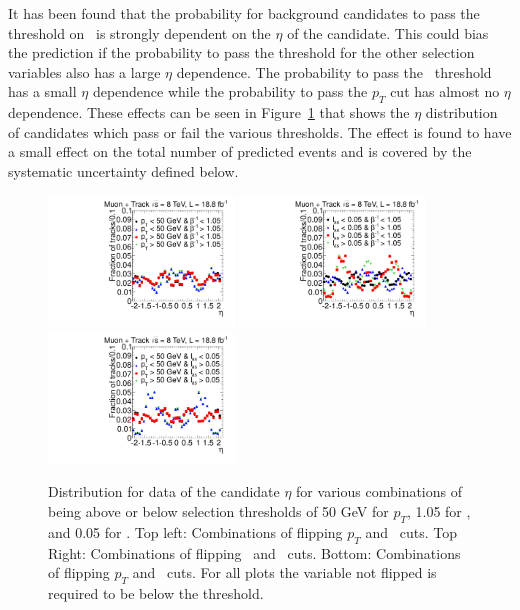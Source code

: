 It has been found that the probability for background candidates to pass the threshold on \ias\ is strongly dependent on the $\eta$ of the candidate. 
This could bias the prediction if the 
probability to pass the threshold for the other selection variables also has a large $\eta$ dependence. The probability to pass the \invbeta\ threshold has a small $\eta$
dependence while the probability to pass the $p_T$ cut has almost no $\eta$ dependence. These effects can be seen in Figure~\ref{fig:etacorrelation} that shows the $\eta$ 
distribution of candidates which
pass or fail the various thresholds. The effect is found to have a small effect on the total number of predicted events and is covered by the systematic uncertainty
defined below.

\begin{figure}
\begin{center}
\includegraphics[clip=true, trim=0.0cm 0cm 3.0cm 0cm, width=0.44\textwidth]{figures/tkmu/Selection_Data8TeV_EtaRegionsPtTOF_016}
\includegraphics[clip=true, trim=0.0cm 0cm 3.0cm 0cm, width=0.44\textwidth]{figures/tkmu/Selection_Data8TeV_EtaRegionsTOFdEdx_016} \\
\includegraphics[clip=true, trim=0.0cm 0cm 3.0cm 0cm, width=0.44\textwidth]{figures/tkmu/Selection_Data8TeV_EtaRegionsPtdEdx_016}
\end{center}
\caption{Distribution for data of the candidate $\eta$ for various combinations of being above or below selection thresholds of 
50 GeV for $p_T$, 1.05 for \invbeta, and 0.05 for \ias.
Top left: Combinations of flipping $p_T$ and \invbeta\ cuts. Top Right: Combinations of flipping \invbeta\ and \ias\ cuts.
Bottom: Combinations of flipping $p_T$ and \ias\ cuts. For all plots the variable not flipped is required to be below the threshold.
\label{fig:etacorrelation}}
\end{figure}

